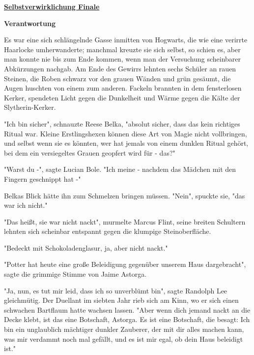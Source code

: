 

\hypertarget{selbstverwirklichung-finale}{%

\textbf{\uline{Selbstverwirklichung Finale}}

\textbf{Verantwortung}

Es war eine sich schlängelnde Gasse inmitten von Hogwarts, die wie eine verirrte Haarlocke umherwanderte; manchmal kreuzte sie sich selbst, so schien es, aber man konnte nie bis zum Ende kommen, wenn man der Versuchung scheinbarer Abkürzungen nachgab. Am Ende des Gewirrs lehnten sechs Schüler an rauen Steinen, die Roben schwarz vor den grauen Wänden und grün gesäumt, die Augen huschten von einem zum anderen. Fackeln brannten in dem fensterlosen Kerker, spendeten Licht gegen die Dunkelheit und Wärme gegen die Kälte der Slytherin-Kerker.

"Ich bin sicher", schnauzte Reese Belka, "absolut sicher, dass das kein richtiges Ritual war. Kleine Erstlingshexen können diese Art von Magie nicht vollbringen, und selbst wenn sie es könnten, wer hat jemals von einem dunklen Ritual gehört, bei dem ein versiegeltes Grauen geopfert wird für - das?"

"Warst du -", sagte Lucian Bole. "Ich meine - nachdem das Mädchen mit den Fingern geschnippt hat -"

Belkas Blick hätte ihn zum Schmelzen bringen müssen. "Nein", spuckte sie, "das war ich nicht."

"Das heißt, sie war nicht nackt", murmelte Marcus Flint, seine breiten Schultern lehnten sich scheinbar entspannt gegen die klumpige Steinoberfläche.

"Bedeckt mit Schokoladenglasur, ja, aber nicht nackt."

"Potter hat heute eine große Beleidigung gegenüber unserem Haus dargebracht", sagte die grimmige Stimme von Jaime Astorga.

"Ja, nun, es tut mir leid, dass ich so unverblümt bin", sagte Randolph Lee gleichmütig. Der Duellant im siebten Jahr rieb sich am Kinn, wo er sich einen schwachen Bartflaum hatte wachsen lassen. "Aber wenn dich jemand nackt an die Decke klebt, ist das eine Botschaft, Astorga. Es ist eine Botschaft, die besagt: Ich bin ein unglaublich mächtiger dunkler Zauberer, der mit dir alles machen kann, was mir verdammt noch mal gefällt, und es ist mir egal, ob dein Haus beleidigt ist."

}
